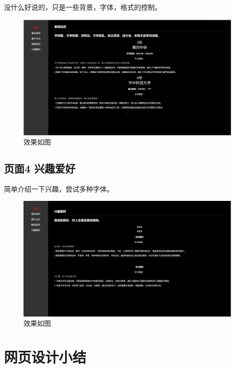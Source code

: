 \documentclass[supercite]{Experimental_Report}
\theoremstyle{definition}
\begin{document}
没什么好说的，只是一些背景，字体，格式的控制。


\begin{figure}[htb]
	\begin{center}
		\includegraphics[scale=0.25]{images/5-1.png}
		\caption{效果如图}
		\label{fig5-1}
	\end{center}
\end{figure}

\subsection{页面4 兴趣爱好}

简单介绍一下兴趣，尝试多种字体。

\begin{figure}[htb]
	\begin{center}
		\includegraphics[scale=0.25]{images/6-1.png}
		\caption{效果如图}
		\label{fig6-1}
	\end{center}
\end{figure}

\newpage

\section{网页设计小结}
\end{document}
